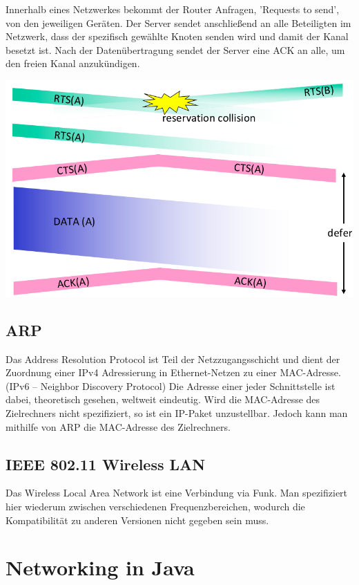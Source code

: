 \documentclass{article}
\begin{document}
    Innerhalb eines Netzwerkes bekommt der Router Anfragen, 'Requests to send', von den jeweiligen Geräten. Der Server sendet anschließend an alle Beteiligten im Netzwerk, dass der spezifisch gewählte Knoten senden wird und damit der Kanal besetzt ist. Nach der Datenübertragung sendet der Server eine ACK an alle, um den freien Kanal anzukündigen.
    \begin{center}
        \includegraphics[width=\textwidth]{CSMACA.png}
    \end{center}

    \subsection{ARP}
    Das Address Resolution Protocol ist Teil der Netzzugangsschicht und dient der Zuordnung einer IPv4 Adressierung in Ethernet-Netzen zu einer MAC-Adresse. (IPv6 -- Neighbor Discovery Protocol)
    Die Adresse einer jeder Schnittstelle ist dabei, theoretisch gesehen, weltweit eindeutig. Wird die MAC-Adresse des Zielrechners nicht spezifiziert, so ist ein IP-Paket unzustellbar. Jedoch kann man mithilfe von ARP die MAC-Adresse des Zielrechners.
    
    \subsection{IEEE 802.11 Wireless LAN}
    Das Wireless Local Area Network ist eine Verbindung via Funk. Man spezifiziert hier wiederum zwischen verschiedenen Frequenzbereichen, wodurch die Kompatibilität zu anderen Versionen nicht gegeben sein muss.
    



\section{Networking in Java}
\end{document}
